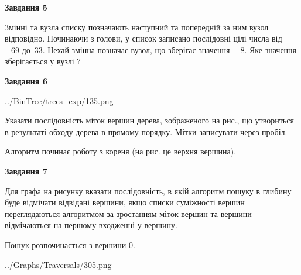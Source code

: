 \documentclass[12pt, ukrainian]{article}
\begin{document}
{\begin {large}
{\begin {center}\textbf{Завдання 5}\end {center}}\par
Змінні  та  вузла списку позначають наступний та попередній за ним вузол відповідно. Починаючи з голови, у список записано послідовні цілі числа від~$-69$ до~$33$. Нехай змінна  позначає вузол, що зберігає значення~$-8$.
Яке значення зберігається у вузлі  ?\par
\newpage

{\begin {center}\textbf{Завдання 6}\end {center}}\par

\begin{center}
	{../BinTree/trees_exp/135.png}
\end{center}
Указати послідовність міток вершин дерева, зображеного на рис., що утвориться в результаті обходу дерева в прямому порядку. Мітки записувати через пробіл.\par Алгоритм починає роботу з кореня (на рис. це верхня вершина).\par
\newpage

{\begin {center}\textbf{Завдання 7}\end {center}}\par
Для графа на рисунку вказати послідовність, в якій алгоритм пошуку в глибину буде відмічати відвідані вершини, якщо списки суміжності вершин переглядаються алгоритмом за зростанням міток вершин та вершини відмічаються на першому вход\-женні у вершину.\par
Пошук розпочинається з вершини 0.\par

\begin{center}
	{../Graphs/Traversals/305.png}
\end{center}\par
\newpage


\end{large}}
\end{document}

